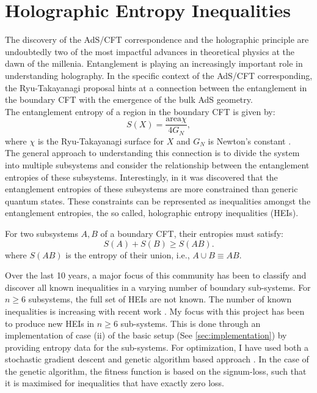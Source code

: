 \section{Holographic Entropy Inequalities}
\label{sec:holographic}
The discovery of the AdS/CFT correspondence \cite{maldacenaLargeNLimitSuperconformal1999} and the holographic principle \cite{susskindWorldHologram1995} are undoubtedly two of the most impactful advances in theoretical physics at the dawn of the millenia. Entanglement is playing an increasingly important role in understanding holography. In the specific context of the AdS/CFT corresponding,
the Ryu-Takayanagi proposal \cite{RT_Entropy_2006} hints at a connection between the entanglement in the boundary CFT with the emergence of the bulk AdS geometry.\\ The entanglement entropy of a region in the boundary CFT is given by:
\begin{equation*}
    S(X) = \frac{\text{area}\chi}{4G_N},
\end{equation*} 
where $\chi$ is the Ryu-Takayanagi surface for $X$ and $G_N$ is Newton's constant \cite{baoPropertiesContractionMap2024}.\\
The general approach to understanding this connection is to divide the system into multiple subsystems and consider the relationship between the entanglement entropies of these subsystems. Interestingly, in \citeyear{haydenHolographicMutualInformation2013} it was discovered that the entanglement entropies of these subsystems are more constrained than generic quantum states. These constraints can be represented as inequalities amongst the entanglement entropies, the so called, holographic entropy inequalities (HEIs).
\begin{exmp}[Subadditivity]
    \label{ex:subadditivity}
    For two subsystems $A, B$ of a boundary CFT, their entropies must satisfy:
    \begin{equation*}
        S(A) + S(B) \geq S(AB).
    \end{equation*} 
    where $S(AB)$ is the entropy of their union, i.e., $A\cup B\equiv AB$.
\end{exmp}
\par
Over the last 10 years, a major focus of this community has been to classify and discover all known inequalities in a varying number of boundary sub-systems. For $n\geq 6$ subsystems, the full set of HEIs are not known. The number of known inequalities is increasing with recent work \cite{hernandez-cuencaHolographicEntropyInequalities2023a}. My focus with this project has been to produce new HEIs in $n\geq 6$ sub-systems. This is done through an implementation of case (ii) of the basic setup (See \ref{sec:implementation}) by providing entropy data for the sub-systems. For optimization, I have used both a stochastic gradient descent and genetic algorithm based approach \cite{Sastry2005}. In the case of the genetic algorithm, the fitness function is based on the signum-loss, such that it is maximised for inequalities that have exactly zero loss.
